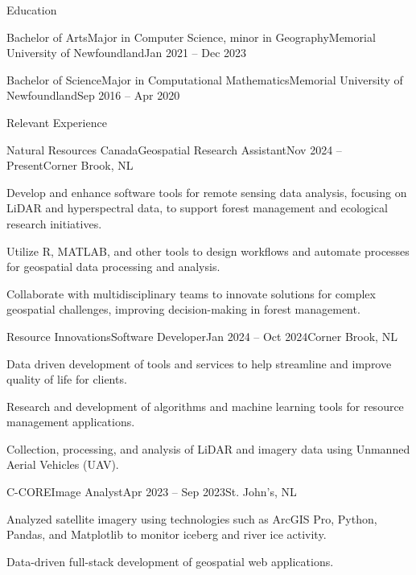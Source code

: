 \documentclass[]{Keenan-Nicholson-Resume}
\begin{document}
\resumeheader
{}
{}
{}
{}
{}

\begin{section}{Education}
    \begin{subsection}{Bachelor of Arts}{Major in Computer Science, minor in Geography}{Memorial University of Newfoundland}{Jan 2021 -- Dec 2023}
    \end{subsection}
    \begin{subsection}{Bachelor of Science}{Major in Computational Mathematics}{Memorial University of Newfoundland}{Sep 2016 -- Apr 2020}
    \end{subsection}
\end{section}

\begin{section}{Relevant Experience}
    \begin{subsection}{Natural Resources Canada}{Geospatial Research Assistant}{Nov 2024 -- Present}{Corner Brook, NL}
        \item Develop and enhance software tools for remote sensing data analysis, focusing on LiDAR and hyperspectral data, to support forest management and ecological research initiatives.
        \item Utilize R, MATLAB, and other tools to design workflows and automate processes for geospatial data processing and analysis.
        \item Collaborate with multidisciplinary teams to innovate solutions for complex geospatial challenges, improving decision-making in forest management.
    \end{subsection}
    \begin{subsection}{Resource Innovations}{Software Developer}{Jan 2024 -- Oct 2024}{Corner Brook, NL}
        \item Data driven development of tools and services to help streamline and improve quality of life for clients.
        \item Research and development of algorithms and machine learning tools for resource management applications.
        \item Collection, processing, and analysis of LiDAR and imagery data using Unmanned Aerial Vehicles (UAV).
    \end{subsection}
    \begin{subsection}{C-CORE}{Image Analyst}{Apr 2023 -- Sep 2023}{St. John's, NL}
        \item Analyzed satellite imagery using technologies such as ArcGIS Pro, Python, Pandas, and Matplotlib to \newline monitor iceberg and river ice activity.
        
        \item Data-driven full-stack development of geospatial web applications.

    \end{subsection}
\end{section}
\end{document}
